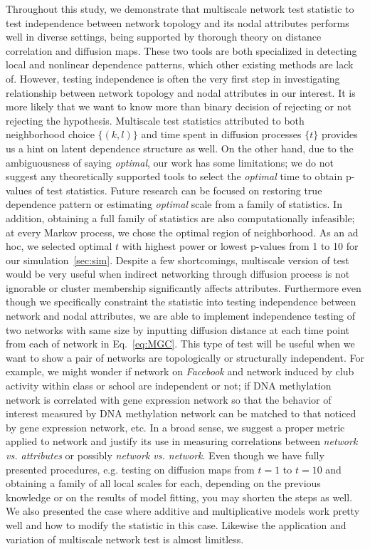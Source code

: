 \documentclass[12pt]{article}
\theoremstyle{definition}
\begin{document}
Throughout this study, we demonstrate that multiscale network test statistic to test  independence between network topology and its nodal attributes performs well in diverse settings, being supported by thorough theory on distance correlation and diffusion maps. These two tools are both specialized in detecting local and nonlinear dependence patterns, which other existing methods are lack of. However, testing independence is often the very first step in investigating relationship between network topology and nodal attributes in our interest. It is more likely that we want to know more than binary decision of rejecting or not rejecting the hypothesis. Multiscale test statistics attributed to both neighborhood choice $\{ (k,l)  \}$ and time spent in diffusion processes $\{ t \}$ provides us a hint on latent dependence structure as well. On the other hand, due to the ambiguousness of saying \textit{optimal}, our work has some limitations; we do not suggest any theoretically supported tools to select the \textit{optimal} time to obtain p-values of test statistics. Future research can be focused on restoring true dependence pattern or estimating \textit{optimal} scale from a family of statistics. In addition, obtaining a full family of statistics are also computationally infeasible; at every Markov process, we chose the optimal region of neighborhood. As an ad hoc, we selected optimal $t$ with highest power or lowest p-values from 1 to 10 for our simulation~\ref{sec:sim}.  
Despite a few shortcomings, multiscale version of test would be very useful when indirect networking through diffusion process is not ignorable or cluster membership significantly affects attributes. Furthermore even though we specifically constraint the statistic into testing independence between network and nodal attributes, we are able to implement independence testing of two networks with same size by inputting diffusion distance at each time point from each of network in Eq.~\ref{eq:MGC}. This type of test will be useful when we want to show a pair of networks are topologically or structurally independent. For example, we might wonder if network on \textit{Facebook} and network induced by club activity within class or school are independent or not; if DNA methylation network is correlated with gene expression network \citep{bartlett2014dna} so that the behavior of interest measured by DNA methylation network can be matched to that noticed by gene expression network, etc.  In a broad sense, we suggest a proper metric applied to network and justify its use in measuring correlations between \textit{network vs. attributes} or possibly \textit{network vs. network}. Even though we have fully presented procedures, e.g. testing on diffusion maps from $t=1$ to $t=10$  and obtaining a family of all local scales for each, depending on the previous knowledge or on the results of model fitting, you may shorten the steps as well. We also presented the case where additive and multiplicative models work pretty well and how to modify the statistic in this case. Likewise the application and variation of multiscale network test is almost limitless. 
\end{document}
